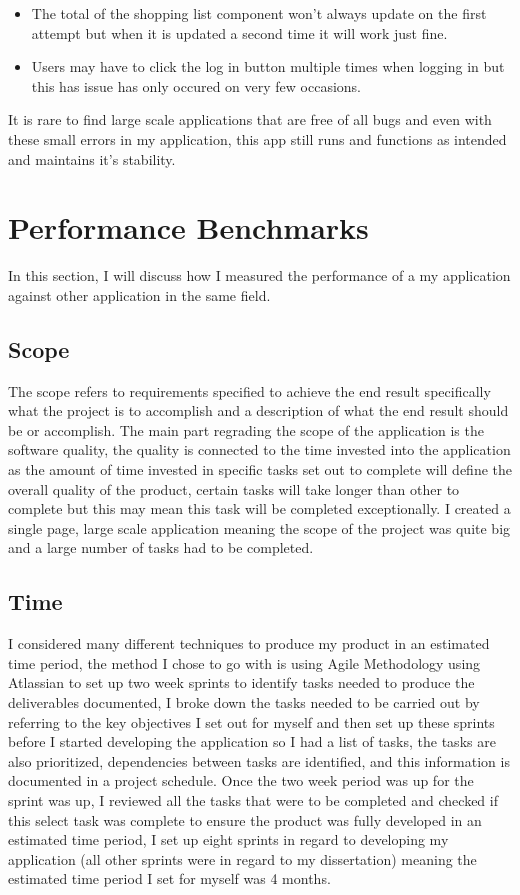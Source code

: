 \begin{itemize}
    \item The total of the shopping list component won't always update on the first attempt but when it is updated a second time it will work just fine.
    \item Users may have to click the log in button multiple times when logging in but this has issue has only occured on very few occasions.
\end{itemize}

It is rare to find large scale applications that are free of all bugs and even with these small errors in my application, this app still runs and functions as intended and maintains it's stability.

\section{Performance Benchmarks}

In this section, I will discuss how I measured the performance of a my application against other application in the same field.

\subsection{Scope}

The scope refers to requirements specified to achieve the end result specifically what the project is to accomplish and a description of what the end result should be or accomplish. The main part regrading the scope of the application is the software quality, the quality is connected to the time invested into the application as the amount of time invested in specific tasks set out to complete will define the overall quality of the product, certain tasks will take longer than other to complete but this may mean this task will be completed exceptionally. I created a single page, large scale application meaning the scope of the project was quite big and a large number of tasks had to be completed.

\subsection{Time}

I considered many different techniques to produce my product in an estimated time period, the method I chose to go with is using Agile Methodology using Atlassian to set up two week sprints to identify tasks needed to produce the deliverables documented, I broke down the tasks needed to be carried out by referring to the key objectives I set out for myself and then set up these sprints before I started developing the application so I had a list of tasks, the tasks are also prioritized, dependencies between tasks are identified, and this information is documented in a project schedule. Once the two week period was up for the sprint was up, I reviewed all the tasks that were to be completed and checked if this select task was complete to ensure the product was fully developed in an estimated time period, I set up eight sprints in regard to developing my application (all other sprints were in regard to my dissertation) meaning the estimated time period I set for myself was 4 months.

